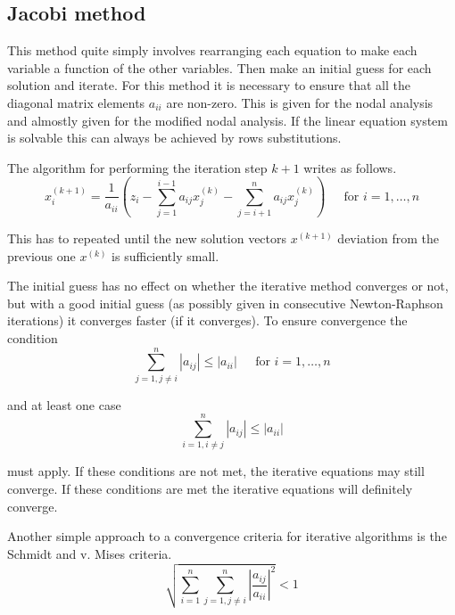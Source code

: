 \subsection{Jacobi method}

This method quite simply involves rearranging each equation to make
each variable a function of the other variables.  Then make an initial
guess for each solution and iterate.  For this method it is necessary
to ensure that all the diagonal matrix elements $a_{ii}$ are non-zero.
This is given for the nodal analysis and almostly given for the
modified nodal analysis.  If the linear equation system is solvable
this can always be achieved by rows substitutions.

\addvspace{12pt}

The algorithm for performing the iteration step $k + 1$ writes as
follows.
\begin{equation}
x_{i}^{(k+1)} = \dfrac{1}{a_{ii}}\left(z_i - \sum_{j=1}^{i-1} a_{ij}x_{j}^{(k)} - \sum_{j=i+1}^{n} a_{ij}x_{j}^{(k)}\right)
\;\;\;\; \textrm{ for } i = 1, \ldots, n
\end{equation}

This has to repeated until the new solution vectors $x^{(k+1)}$
deviation from the previous one $x^{(k)}$ is sufficiently small.

\addvspace{12pt}

The initial guess has no effect on whether the iterative method
converges or not, but with a good initial guess (as possibly given in
consecutive Newton-Raphson iterations) it converges faster (if it
converges).  To ensure convergence the condition
\begin{equation}
\sum_{j = 1, j \ne i}^{n} \left|a_{ij}\right| \le \left|a_{ii}\right|
\;\;\;\; \textrm{ for } i = 1, \ldots, n
\end{equation}

and at least one case
\begin{equation}
\sum_{i = 1, i \ne j}^{n} \left|a_{ij}\right| \le \left|a_{ii}\right|
\end{equation}

must apply.  If these conditions are not met, the iterative equations
may still converge.  If these conditions are met the iterative
equations will definitely converge.

\addvspace{12pt}

Another simple approach to a convergence criteria for iterative
algorithms is the Schmidt and v. Mises criteria.
\begin{equation}
\sqrt{\sum_{i = 1}^n \sum_{j = 1, j \ne i}^n \left|\dfrac{a_{ij}}{a_{ii}}\right|^2} < 1
\end{equation}

